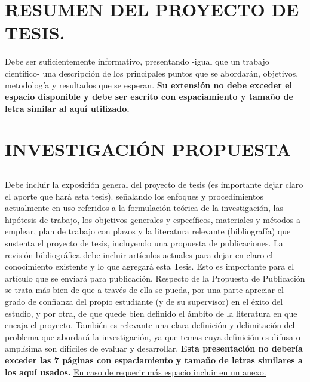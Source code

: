 \documentclass[11pt,letterpaper]{article}
\begin{document}
\newpage

\section{RESUMEN DEL PROYECTO DE TESIS.} 

Debe ser suficientemente informativo, presentando -igual que un trabajo científico- una descripción de los principales puntos que se abordarán, objetivos, metodología y resultados que se esperan. \textbf{Su extensión no debe exceder el espacio disponible y debe ser escrito con espaciamiento y tamaño de letra similar al aquí utilizado.}

\begin{tcolorbox}[breakable,before upper={\parindent15pt}]

\lipsum[1-4]

\end{tcolorbox}



\newpage

\section{INVESTIGACIÓN PROPUESTA}
  
\subsection{}Debe incluir la exposición general del proyecto de tesis (es importante dejar claro el aporte que hará esta tesis). señalando los enfoques y procedimientos actualmente en uso referidos a la formulación teórica de la investigación, las hipótesis de trabajo, los objetivos generales y específicos, materiales y métodos a emplear, plan de trabajo con plazos y la literatura relevante (bibliografía) que sustenta el proyecto de tesis, incluyendo una propuesta de publicaciones. La revisión bibliográfica debe incluir artículos actuales para dejar en claro el conocimiento existente y lo que agregará esta Tesis. Esto es importante para el artículo que se enviará para publicación. Respecto de la Propuesta de Publicación se trata más bien de que a través de ella se pueda, por una parte apreciar el grado de confianza del propio estudiante (y de su supervisor) en el éxito del estudio, y por otra, de que quede bien definido el ámbito de la literatura en que encaja el proyecto. También es relevante una clara definición y delimitación del problema que abordará la investigación, ya que temas cuya definición es difusa o amplísima son difíciles de evaluar y desarrollar. \textbf{Esta presentación no debería exceder las 7 páginas con espaciamiento y tamaño de letras similares a los aquí usados.} \underline{En caso de requerir más espacio incluir en un anexo.}
\end{document}
